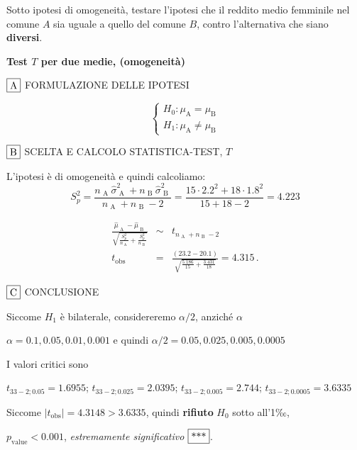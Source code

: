 \documentclass[
  11pt,
]{book}
\theoremstyle{mytheoremstyle}
\theoremstyle{mydefstyle}
\newenvironment{sol}
  {
  \begin{tcolorbox}[enhanced,breakable,arc=0.1mm,boxrule=1pt,colback=white,colframe=iblue,
  title=\bf \fontfamily{lmss}\selectfont \hspace{.5 cm} Soluzione,drop fuzzy shadow]

}{
\end{tcolorbox}
  }
\begin{document}
Sotto ipotesi di omogeneità, testare l'ipotesi che il reddito medio femminile nel comune \(A\) sia uguale a quello del comune \(B\), contro l'alternativa che siano \textbf{diversi}.

\begin{sol}
\textbf{Test \(T\) per due medie, (omogeneità)}

\(\fbox{A}\) FORMULAZIONE DELLE IPOTESI

\[\begin{cases}
   H_0: \mu_\text{A} = \mu_\text{B} \\
   H_1: \mu_\text{A} \neq \mu_\text{B} 
   \end{cases}\]

\(\fbox{B}\) SCELTA E CALCOLO STATISTICA-TEST, \(T\)

L'ipotesi è di omogeneità e quindi calcoliamo:\[
   S_p^2=\frac{n_\text{ A }\hat\sigma^2_\text{ A }+n_\text{ B }\hat\sigma^2_\text{ B }}{n_\text{ A }+n_\text{ B }-2} =
   \frac{ 15 \cdot 2.2 ^2+ 18 \cdot 1.8 ^2}{ 15 + 18 -2}= 4.223 
  \]

\begin{eqnarray*}
  \frac{\hat\mu_\text{ A } - \hat\mu_\text{ B }}
  {\sqrt{\frac {S^2_p}{n_\text{ A }}+\frac {S^2_p}{n_\text{ B }}}}&\sim&t_{n_\text{ A }+n_\text{ B }-2}\\
  t_{\text{obs}}
  &=& \frac{ ( 23.2 -  20.1 )} {\sqrt{\frac{ 5.186 }{ 15 }+\frac{ 3.431 }{ 18 }}}
  =   4.315 \, .
  \end{eqnarray*}

\(\fbox{C}\) CONCLUSIONE

Siccome \(H_1\) è bilaterale, considereremo \(\alpha/2\),
anziché \(\alpha\)

\(\alpha=0.1, 0.05, 0.01, 0.001\) e quindi \(\alpha/2=0.05, 0.025, 0.005, 0.0005\)

I valori critici sono

\(t_{33-2;0.05}=1.6955\); \(t_{33-2;0.025}=2.0395\); \(t_{33-2;0.005}=2.744\); \(t_{33-2;0.0005}=3.6335\)

Siccome \(|t_\text{obs}|=4.3148>3.6335\), quindi \textbf{rifiuto} \(H_0\) sotto all'1‰,

\(p_\text{value}<0.001\), \emph{estremamente significativo} \(\fbox{***}\).


\end{sol}
\end{document}

